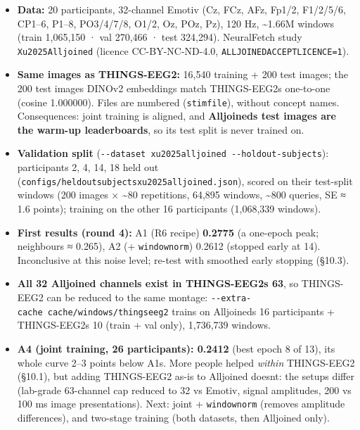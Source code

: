 \documentclass[
  11pt,
]{article}
\providecommand{\tightlist}{%
  \setlength{\itemsep}{0pt}\setlength{\parskip}{0pt}}
\renewcommand{\_}{\oldunderscore\allowbreak}
\begin{document}
\begin{itemize}
\tightlist
\item
  \textbf{Data:} 20 participants,
  32-channel Emotiv (Cz, FCz, AFz,
  Fp1/2, F1/2/5/6, CP1--6, P1--8,
  PO3/4/7/8, O1/2, Oz, POz, Pz), 120 Hz,
  \textasciitilde1.66M windows (train
  1,065,150 · val 270,466 · test
  324,294). NeuralFetch study
  \texttt{Xu2025Alljoined} (licence
  CC-BY-NC-ND-4.0,
  \texttt{ALLJOINED\_ACCEPT\_LICENCE=1}).
\item
  \textbf{Same images as THINGS-EEG2:}
  16,540 training + 200 test images; the
  200 test images\textquotesingle{}
  DINOv2 embeddings match
  THINGS-EEG2\textquotesingle s
  one-to-one (cosine 1.000000). Files
  are numbered (\texttt{stim\_file}),
  without concept names. Consequences:
  joint training is aligned, and
  \textbf{Alljoined\textquotesingle s
  test images are the warm-up
  leaderboard\textquotesingle s}, so its
  test split is never trained on.
\item
  \textbf{Validation split}
  (\texttt{-\/-dataset\ xu2025alljoined\ -\/-holdout-subjects}):
  participants 2, 4, 14, 18 held out
  (\texttt{configs/heldout\_subjects\_xu2025alljoined.json}),
  scored on their test-split windows
  (200 images × \textasciitilde80
  repetitions, 64,895 windows,
  \textasciitilde800 queries, SE ≈ 1.6
  points); training on the other 16
  participants (1,068,339 windows).
\item
  \textbf{First results (round 4):} A1
  (R6 recipe) \textbf{0.2775} (a
  one-epoch peak; neighbours ≈ 0.265),
  A2 (+ \texttt{window\_norm}) 0.2612
  (stopped early at 14). Inconclusive at
  this noise level; re-test with
  smoothed early stopping (§10.3).
\item
  \textbf{All 32 Alljoined channels
  exist in THINGS-EEG2\textquotesingle s
  63}, so THINGS-EEG2 can be reduced to
  the same montage:
  \texttt{-\/-extra-cache\ cache/windows/things\_eeg2}
  trains on Alljoined\textquotesingle s
  16 participants +
  THINGS-EEG2\textquotesingle s 10
  (train + val only), 1,736,739 windows.
\item
  \textbf{A4 (joint training, 26
  participants): 0.2412} (best epoch 8
  of 13), its whole curve 2--3 points
  below A1\textquotesingle s. More
  people helped \emph{within}
  THINGS-EEG2 (§10.1), but adding
  THINGS-EEG2 as-is to Alljoined
  doesn\textquotesingle t: the setups
  differ (lab-grade 63-channel cap
  reduced to 32 vs Emotiv, signal
  amplitudes, 200 vs 100 ms image
  presentations). Next: joint +
  \texttt{window\_norm} (removes
  amplitude differences), and two-stage
  training (both datasets, then
  Alljoined only).
\end{itemize}
\end{document}

